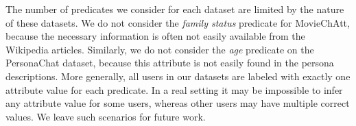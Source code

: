  The number of predicates we consider for each dataset are limited by the nature of these datasets. We do not consider the \textit{family status} predicate for MovieChAtt, because the necessary information is often not easily available from the Wikipedia articles. Similarly, we do not consider the \textit{age} predicate on the PersonaChat dataset, because this attribute is not easily found in the persona descriptions. More generally, all users in our datasets are labeled with exactly one attribute value for each predicate. In a real setting it may be impossible to infer any attribute value for some users, whereas other users may have multiple correct values. We leave such scenarios for future work.


